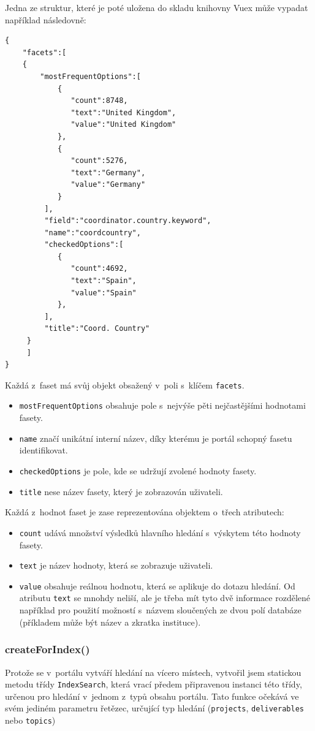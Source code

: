 Jedna ze struktur, které je poté uložena do skladu knihovny Vuex může vypadat například následovně:

\begin{verbatim}
{
    "facets":[
    {
        "mostFrequentOptions":[  
            {  
               "count":8748,
               "text":"United Kingdom",
               "value":"United Kingdom"
            },
            {  
               "count":5276,
               "text":"Germany",
               "value":"Germany"
            }
         ],
         "field":"coordinator.country.keyword",
         "name":"coordcountry",
         "checkedOptions":[  
            {  
               "count":4692,
               "text":"Spain",
               "value":"Spain"
            },
         ],
         "title":"Coord. Country"
     }
     ]
}
\end{verbatim}
Každá z~faset má svůj objekt obsažený v~poli s~klíčem \texttt{facets}.
\begin{itemize}
\item \texttt{mostFrequentOptions} obsahuje pole s~nejvýše pěti nejčastějšími hodnotami fasety.
\item \texttt{name} značí unikátní interní název, díky kterému je portál schopný fasetu identifikovat.
\item \texttt{checkedOptions} je pole, kde se udržují zvolené hodnoty fasety.
\item \texttt{title} nese název fasety, který je zobrazován uživateli.
\end{itemize}
Každá z~hodnot faset je zase reprezentována objektem o~třech atributech:
\begin{itemize}
\item \texttt{count} udává množství výsledků hlavního hledání s~výskytem této hodnoty fasety.
\item \texttt{text} je název hodnoty, která se zobrazuje uživateli.
\item \texttt{value} obsahuje reálnou hodnotu, která se aplikuje do dotazu hledání. Od atributu \texttt{text} se mnohdy neliší, ale je třeba mít tyto dvě informace rozdělené například pro použití možností s~názvem sloučených ze dvou polí databáze (příkladem může být název a zkratka instituce).
\end{itemize}

\subsubsection*{createForIndex()}
Protože se v~portálu vytváří hledání na vícero místech, vytvořil jsem statickou metodu třídy \texttt{IndexSearch}, která vrací předem připravenou instanci této třídy, určenou pro hledání v~jednom z~typů obsahu portálu. Tato funkce očekává ve svém jediném parametru řetězec, určující typ hledání (\texttt{projects}, \texttt{deliverables} nebo \texttt{topics})

